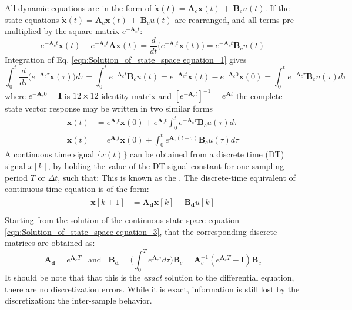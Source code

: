 \documentclass[12pt]{article}
\begin{document}
\par \noindent All dynamic equations are in the form of $\bm{\dot{x}}(t)=\bm{A}_{c}\bm{x}(t)\,+\,\bm{B}_{c}u(t)$. If the state equations $\dot{\bm{x}}(t) = \bm{A}_{c}\bm{x}(t)\,+\,\bm{B}_{c}u(t)$ are rearranged, and all terms pre-multiplied by the square matrix $e^{-\bm{A}_{c}t}$:
\begin{equation}
	\label{eqn:Solution_of_state_space equation_1}
	e^{-\bm{A}_{c}t}\dot{\bm{x}}(t) - e^{-\bm{A}_{c}t}\bm{A}\bm{x}(t) = \frac{d}{dt}\bigg(e^{-\bm{A}_{c}t}\bm{x}(t)\bigg)  = e^{-\bm{A}_{c}t}\bm{B}_{c}u(t)
\end{equation}
\noindent Integration of Eq. \ref{eqn:Solution_of_state_space equation_1} gives
\begin{equation}
	\label{eqn:Solution_of_state_space equation_2}
	\int_{0}^{t}\frac{d}{d\tau}\bigg(e^{-\bm{A}_{c}\tau}\bm{x}(\tau)\bigg) d\tau = \int_{0}^{t} e^{-\bm{A}_{c}t}\bm{B}_{c}u(t) =  e^{-\bm{A}_{c}t}\bm{x}(t) - e^{-\bm{A}_{c}0}\bm{x}(0) = \int_{0}^{t} e^{-\bm{A}_{c}\tau}\bm{B}_{c}u(\tau)d\tau
\end{equation}
\noindent where $e^{-\bm{A}_{c}0} = \bm{I}$ is $12\times12$ identity matrix and $[e^{-\bm{A}_{c}t}]^{-1} = e^{\bm{A}t}$ the complete state vector response may be written in two similar forms
\begin{subequations} 
	\label{eqn:Solution_of_state_space equation_3}
	\begin{align} 
		\bm{x}(t) &= e^{\bm{A}_{c}t}\bm{x}(0)  + e^{\bm{A}_{c}t}\int_{0}^{t} e^{-\bm{A}_{c}\tau}\bm{B}_{c}u(\tau)d\tau\\
		\bm{x}(t) &= e^{\bm{A}_{c}t}\bm{x}(0)  + \int_{0}^{t} e^{\bm{A}_{c}(t-\tau)}\bm{B}_{c}u(\tau)d\tau
	\end{align} 
\end{subequations}
\noindent A continuous time signal $\{x(t)\}$ can be obtained from a discrete time (DT) signal ${x[k]}$, by holding the value of the DT signal constant for one sampling period $T$ or $\Delta t$, such that: This is known as the . The discrete-time equivalent of continuous time equation is of the form:
\begin{align}
	\begin{split}
		\bm{x}[k+1] &= \bm{A_{d}}\bm{x}[k] + \bm{B_{d}}u[k] \\
	\end{split}
\end{align}
\noindent Starting from the solution of the continuous state-space equation \ref{eqn:Solution_of_state_space equation_3}, that the corresponding discrete matrices are obtained as: 
\begin{equation}
	\label{eqn:discrete_system_matrices}
	\bm{A_d} = e^{\bm{A}_{c}T}\;\;\;\text{and}\;\;\;\bm{B_{d}}=\bigg(\int_{0}^{T}e^{\bm{A}_{c}\tau}d\tau\bigg)\bm{B}_{c} = \bm{A}_{c}^{-1}(e^{\bm{A}_{c}T}-\bm{I})\bm{B}_{c} 
\end{equation}
\noindent It should be note that that this is the \textit{exact} solution to the differential equation, there are no discretization errors. While it is exact, information is still lost by the discretization: the inter-sample behavior.
\end{document}
